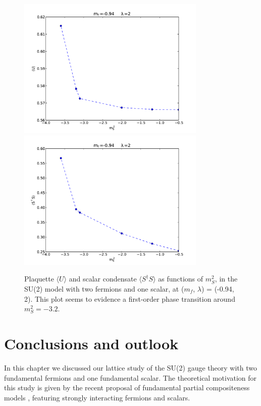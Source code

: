 \begin{figure}[thb] 
\begin{adjustwidth}{-4em}{-4em}
  \includegraphics[width=9cm,clip]{pics/jump_plaquette}\includegraphics[width=9cm,clip]{pics/jump_condensate}
\end{adjustwidth}
  \caption{Plaquette $\langle U \rangle$ and scalar condensate $\langle S^{\dagger} S \rangle$ as functions of $m_S^2$, in the SU(2) model with two fermions and one scalar, at ($m_f$, $\lambda$) = (-0.94, 2). This plot seems to evidence a first-order phase transition around $m_S^2 = -3.2$.}
  \label{jump_pl_cond}
\end{figure}



\section{Conclusions and outlook}

In this chapter we discussed our lattice study of the SU(2) gauge theory with two fundamental fermions and one fundamental scalar. The theoretical motivation for this study is given by the recent proposal of fundamental partial compositeness models \cite{Sannino:2016sfx}, featuring strongly interacting fermions and scalars.

